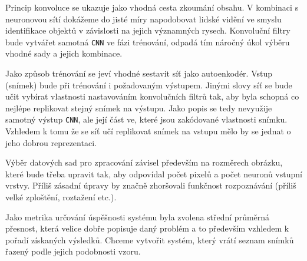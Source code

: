 \documentclass[12pt]{article}
\begin{document}
Princip konvoluce se ukazuje jako vhodná cesta zkoumání obsahu. V kombinaci s neuronovou sítí dokážeme do jisté míry napodobovat lidské vidění ve smyslu identifikace objektů v závislosti na jejich významných rysech. Konvoluční filtry bude vytvářet samotná \texttt{CNN} ve fázi trénování, odpadá tím náročný úkol výběru vhodné sady a jejich kombinace.

Jako způsob trénování se jeví vhodné sestavit síť jako autoenkodér. Vstup (snímek) bude při trénování i požadovaným výstupem. Jinými slovy síť se bude učit vybírat vlastnosti nastavováním konvolučních filtrů tak, aby byla schopná co nejlépe replikovat stejný snímek na výstupu. Jako popis se tedy nevyužije samotný výstup \texttt{CNN}, ale její část ve, které jsou zakódované vlastnosti snímku. Vzhledem k tomu že se síť učí replikovat snímek na vstupu mělo by se jednat o jeho dobrou reprezentaci.

Výběr datových sad pro zpracování závisel především na rozměrech obrázku, které bude třeba upravit tak, aby odpovídal počet pixelů a počet neuronů vstupní vrstvy. Příliš zásadní úpravy by značně zhoršovali funkčnost rozpoznávání (příliš velké zploštění, roztažení etc.).

Jako metrika určování úspěšnosti systému byla zvolena střední průměrná přesnost, která velice dobře popisuje daný problém a to především vzhledem k pořadí získaných výsledků. Chceme vytvořit systém, který vrátí seznam snímků řazený podle jejich podobnosti vzoru.


\pagebreak


%
\end{document}
